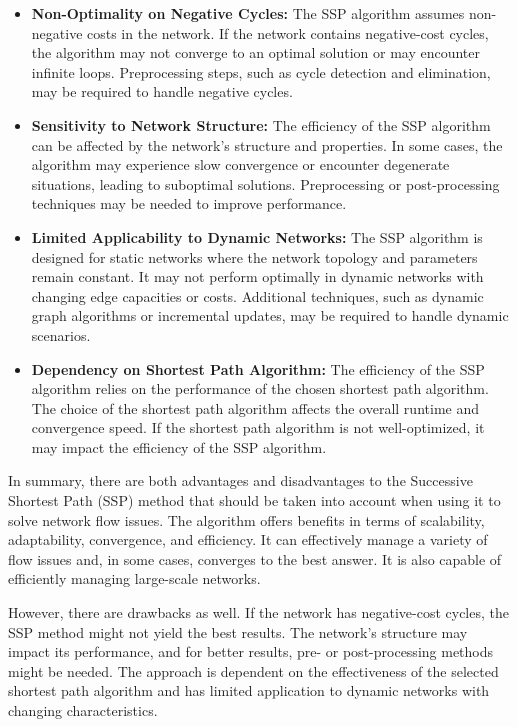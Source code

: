 \documentclass[a4paper]{article}
\begin{document}
		\begin{itemize}
			\item \textbf{Non-Optimality on Negative Cycles:} The SSP algorithm assumes non-negative costs in the network. If the network contains negative-cost cycles, the algorithm may not converge to an optimal solution or may encounter infinite loops. Preprocessing steps, such as cycle detection and elimination, may be required to handle negative cycles.
			\item \textbf{Sensitivity to Network Structure:} The efficiency of the SSP algorithm can be affected by the network's structure and properties. In some cases, the algorithm may experience slow convergence or encounter degenerate situations, leading to suboptimal solutions. Preprocessing or post-processing techniques may be needed to improve performance.
			\item \textbf{Limited Applicability to Dynamic Networks:} The SSP algorithm is designed for static networks where the network topology and parameters remain constant. It may not perform optimally in dynamic networks with changing edge capacities or costs. Additional techniques, such as dynamic graph algorithms or incremental updates, may be required to handle dynamic scenarios.
			\item \textbf{Dependency on Shortest Path Algorithm:} The efficiency of the SSP algorithm relies on the performance of the chosen shortest path algorithm. The choice of the shortest path algorithm affects the overall runtime and convergence speed. If the shortest path algorithm is not well-optimized, it may impact the efficiency of the SSP algorithm.
		\end{itemize}
		In summary, there are both advantages and disadvantages to the Successive Shortest Path (SSP) method that should be taken into account when using it to solve network flow issues. The algorithm offers benefits in terms of scalability, adaptability, convergence, and efficiency. It can effectively manage a variety of flow issues and, in some cases, converges to the best answer. It is also capable of efficiently managing large-scale networks.
		
		However, there are drawbacks as well. If the network has negative-cost cycles, the SSP method might not yield the best results. The network's structure may impact its performance, and for better results, pre- or post-processing methods might be needed. The approach is dependent on the effectiveness of the selected shortest path algorithm and has limited application to dynamic networks with changing characteristics.
		
\end{document}
